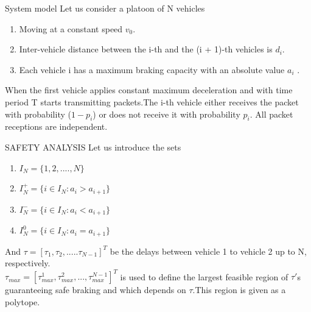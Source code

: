 \documentclass{beamer}
\begin{document}
\begin{frame}
\begin{block}{System model}
Let us consider a platoon of N vehicles
\begin{enumerate}
    \item  Moving at a constant speed $v_{0}$.
    \item  Inter-vehicle distance between the i-th and the (i + 1)-th vehicles is $d_{i}$.
    \item  Each vehicle i has a maximum braking capacity with an absolute value $a_{i}$ .
\end{enumerate} 
\end{block}
When the first vehicle applies constant maximum deceleration and with
time period T starts transmitting packets.The i-th vehicle either receives the packet with probability ($1-p_{i}$) or does not receive it with probability $p_{i}$. All packet receptions are independent.    
\end{frame}
\begin{frame}{SAFETY ANALYSIS}
    Let us introduce the sets
    \begin{enumerate}
        \item $I_{N} = \{1,2,....,N\}$ \\
        \item $I^{+}_{N} = \{i \in I_{N} : a_{i} > a_{i+1}\} $\\
        \item $I^{-}_{N} = \{i \in I_{N} : a_{i} < a_{i+1}\} $\\
        \item $I^{0}_{N} = \{i \in I_{N} : a_{i} = a_{i+1}\} $\\
    \end{enumerate}
    And $\tau = [\tau_{1},\tau_{2},.....\tau_{N-1} ]^{T}$ be the delays between vehicle 1 to vehicle 2 up to N, respectively.\\ 
    $\tau_{max} = [\tau_{max}^{1},\tau_{max}^{2},...,\tau_{max}^{N-1}]^{T}$ is used to define the largest feasible region of $\tau'$s guaranteeing safe braking and which depends on $\tau$.This region is given as a polytope.
\end{frame}
\end{document}
